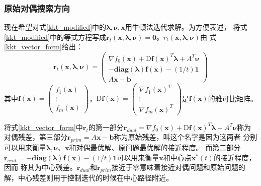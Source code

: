 \documentclass{article}
\begin{document}
\subsubsection{原始对偶搜索方向}
现在希望对式\eqref{kkt_modified}中的$\bm\lambda,\bm\nu,\bm x$用牛顿法迭代求解。为方便表述，
将式\eqref{kkt_modified}中的等式方程写成$\bm r_t(\bm x,\bm\lambda,\bm\nu)=\bm 0$。$r_t(\bm x,\bm\lambda,\bm\nu)$由
式\eqref{kkt_vector_form}给出：
\begin{equation}
\label{kkt_vector_form}
\bm r_t(\bm x,\bm\lambda,\bm\nu)=\begin{pmatrix}
    \nabla f_0(\bm x)+\text{D}\textbf{f}(\bm x)^T\bm\lambda+A^T\bm\nu \\
    -\textbf{diag}(\bm\lambda)\textbf{f}(\bm x)-(1/t)\bm 1 \\
    A\bm x-\bm b
\end{pmatrix}
\end{equation}
其中$\textbf{f}(\bm x)=\begin{pmatrix}
    f_1(\bm x) \\
    \vdots \\
    f_m(\bm x)
\end{pmatrix}$，$\text{D}\textbf{f}(\bm x)=\begin{pmatrix}
    \nabla f_1(\bm x)^T \\
    \vdots \\
    \nabla f_m(\bm x)^T
\end{pmatrix}$是$\textbf{f}(\bm x)$的雅可比矩阵。

将式\eqref{kkt_vector_form}中$\bm r_t$的第一部分$\bm r_{dual}=\nabla f_0(\bm x)+\text{D}\textbf{f}(\bm x)^T\bm\lambda+A^T\bm\nu$称为对偶残差，第三部分$\bm r_{prim}=A\bm x-\bm b$称为原始残差，叫这个名字是因为这两者
分别可以用来衡量$\bm\lambda,\bm\nu$、$\bm x$和对偶最优解、原问题最优解的接近程度。
而第二部分$\bm r_{cent}=-\textbf{diag}(\bm\lambda)\textbf{f}(\bm x)-(1/t)\bm 1$可以用来衡量$\bm x$和中心点$\bm x^*(t)$的接近程度，因而
称其为中心残差。$\bm r_{dual}$和$\bm r_{prim}$接近于零意味着接近对偶问题和原始问题的解，中心残差则用于控制迭代的时候在中心路径附近。
\end{document}
